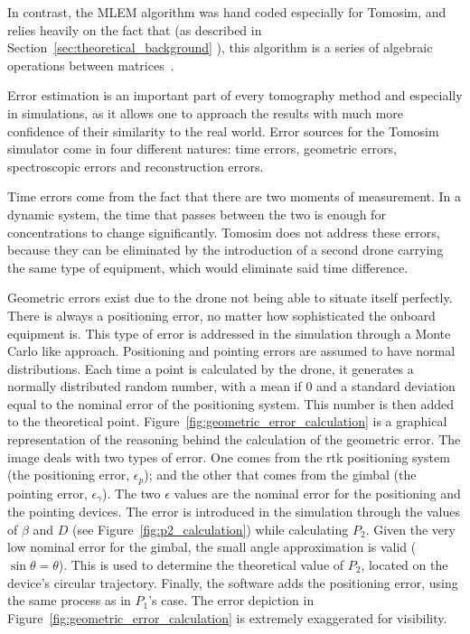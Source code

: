 In contrast, the \gls{MLEM} algorithm was hand coded especially for
Tomosim, and relies heavily on the fact that (as described in
Section~\ref{sec:theoretical_background} ), this algorithm is a series
of algebraic operations between matrices~.

Error estimation is an important part of every tomography method and
especially in simulations, as it allows one to approach the results with
much more confidence of their similarity to the real world. Error
sources for the Tomosim simulator come in four different natures: time
errors, geometric errors, spectroscopic errors and reconstruction
errors.

Time errors come from the fact that there are two moments of
measurement. In a dynamic system, the time that passes between the two
is enough for concentrations to change significantly. Tomosim does not
address these errors, because they can be eliminated by the introduction
of a second drone carrying the same type of equipment, which would
eliminate said time difference.

Geometric errors exist due to the drone not being able to situate itself
perfectly. There is always a positioning error, no matter how
sophisticated the onboard equipment is. This type of error is addressed
in the simulation through a Monte Carlo like approach. Positioning and
pointing errors are assumed to have normal distributions. Each time a
point is calculated by the drone, it generates a normally distributed
random number, with a mean if 0 and a standard deviation equal to the
nominal error of the positioning system. This number is then added to
the theoretical point.  Figure~\ref{fig:geometric_error_calculation} is
a graphical representation of the reasoning behind the calculation of
the geometric error. The image deals with two types of error. One comes
from the \gls{rtk} positioning system (the positioning error,
$\epsilon_p$); and the other that comes from the gimbal (the pointing
error, $\epsilon_\gamma$). The two $\epsilon$ values are the nominal
error for the positioning and the pointing devices. The error is
introduced in the simulation through the values of $\beta$ and $D$ (see
Figure~\ref{fig:p2_calculation}) while calculating $P_2$. Given the very
low nominal error for the gimbal, the small angle approximation is valid
($\sin \theta = \theta$). This is used to determine the theoretical
value of $P_2$, located on the device's circular trajectory. Finally,
the software adds the positioning error, using the same process as in
$P_1$'s case. The error depiction in
Figure~\ref{fig:geometric_error_calculation} is extremely exaggerated
for visibility.

